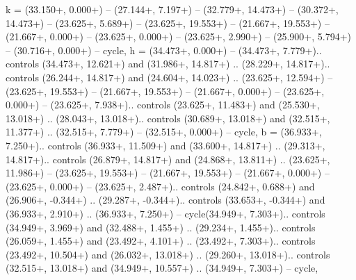 {k} = {(33.150+\ctpXshift, 0.000+\ctpYshift) -- (27.144+\ctpXshift, 7.197+\ctpYshift) -- (32.779+\ctpXshift, 14.473+\ctpYshift) -- (30.372+\ctpXshift, 14.473+\ctpYshift) -- (23.625+\ctpXshift, 5.689+\ctpYshift) -- (23.625+\ctpXshift, 19.553+\ctpYshift) -- (21.667+\ctpXshift, 19.553+\ctpYshift) -- (21.667+\ctpXshift, 0.000+\ctpYshift) -- (23.625+\ctpXshift, 0.000+\ctpYshift) -- (23.625+\ctpXshift, 2.990+\ctpYshift) -- (25.900+\ctpXshift, 5.794+\ctpYshift) -- (30.716+\ctpXshift, 0.000+\ctpYshift) -- cycle},
{h} = {(34.473+\ctpXshift, 0.000+\ctpYshift) -- (34.473+\ctpXshift, 7.779+\ctpYshift).. controls (34.473+\ctpXshift, 12.621+\ctpYshift) and (31.986+\ctpXshift, 14.817+\ctpYshift) .. (28.229+\ctpXshift, 14.817+\ctpYshift).. controls (26.244+\ctpXshift, 14.817+\ctpYshift) and (24.604+\ctpXshift, 14.023+\ctpYshift) .. (23.625+\ctpXshift, 12.594+\ctpYshift) -- (23.625+\ctpXshift, 19.553+\ctpYshift) -- (21.667+\ctpXshift, 19.553+\ctpYshift) -- (21.667+\ctpXshift, 0.000+\ctpYshift) -- (23.625+\ctpXshift, 0.000+\ctpYshift) -- (23.625+\ctpXshift, 7.938+\ctpYshift).. controls (23.625+\ctpXshift, 11.483+\ctpYshift) and (25.530+\ctpXshift, 13.018+\ctpYshift) .. (28.043+\ctpXshift, 13.018+\ctpYshift).. controls (30.689+\ctpXshift, 13.018+\ctpYshift) and (32.515+\ctpXshift, 11.377+\ctpYshift) .. (32.515+\ctpXshift, 7.779+\ctpYshift) -- (32.515+\ctpXshift, 0.000+\ctpYshift) -- cycle},
{b} = {(36.933+\ctpXshift, 7.250+\ctpYshift).. controls (36.933+\ctpXshift, 11.509+\ctpYshift) and (33.600+\ctpXshift, 14.817+\ctpYshift) .. (29.313+\ctpXshift, 14.817+\ctpYshift).. controls (26.879+\ctpXshift, 14.817+\ctpYshift) and (24.868+\ctpXshift, 13.811+\ctpYshift) .. (23.625+\ctpXshift, 11.986+\ctpYshift) -- (23.625+\ctpXshift, 19.553+\ctpYshift) -- (21.667+\ctpXshift, 19.553+\ctpYshift) -- (21.667+\ctpXshift, 0.000+\ctpYshift) -- (23.625+\ctpXshift, 0.000+\ctpYshift) -- (23.625+\ctpXshift, 2.487+\ctpYshift).. controls (24.842+\ctpXshift, 0.688+\ctpYshift) and (26.906+\ctpXshift, -0.344+\ctpYshift) .. (29.287+\ctpXshift, -0.344+\ctpYshift).. controls (33.653+\ctpXshift, -0.344+\ctpYshift) and (36.933+\ctpXshift, 2.910+\ctpYshift) .. (36.933+\ctpXshift, 7.250+\ctpYshift) -- cycle(34.949+\ctpXshift, 7.303+\ctpYshift).. controls (34.949+\ctpXshift, 3.969+\ctpYshift) and (32.488+\ctpXshift, 1.455+\ctpYshift) .. (29.234+\ctpXshift, 1.455+\ctpYshift).. controls (26.059+\ctpXshift, 1.455+\ctpYshift) and (23.492+\ctpXshift, 4.101+\ctpYshift) .. (23.492+\ctpXshift, 7.303+\ctpYshift).. controls (23.492+\ctpXshift, 10.504+\ctpYshift) and (26.032+\ctpXshift, 13.018+\ctpYshift) .. (29.260+\ctpXshift, 13.018+\ctpYshift).. controls (32.515+\ctpXshift, 13.018+\ctpYshift) and (34.949+\ctpXshift, 10.557+\ctpYshift) .. (34.949+\ctpXshift, 7.303+\ctpYshift) -- cycle},
